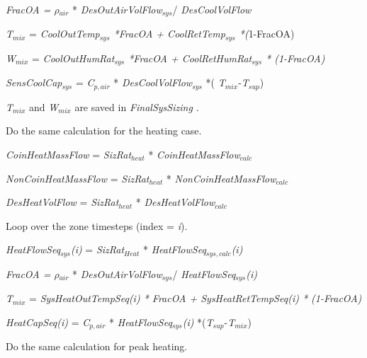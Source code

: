 \emph{FracOA = $\rho$\(_{air}\)} * \emph{DesOutAirVolFlow\(_{sys}\)}/ \emph{DesCoolVolFlow}

\emph{T\(_{mix}\)} = \emph{CoolOutTemp\(_{sys}\) *FracOA + CoolRetTemp\(_{sys}\) *(}1-FracOA)

\emph{W\(_{mix}\)} = \emph{CoolOutHumRat\(_{sys}\) *FracOA + CoolRetHumRat\(_{sys}\) * (1-FracOA)}

\emph{SensCoolCap\(_{sys}\)} = \emph{C\(_{p,air}\)} * \emph{DesCoolVolFlow\(_{sys}\)} *( \emph{T\(_{mix}\)}-\emph{T\(_{sup}\)})

\emph{T\(_{mix}\)} and \emph{W\(_{mix}\)} are saved in \emph{FinalSysSizing} \emph{.}

\begin{enumerate}
\def\labelenumi{(\roman{enumi})}
\setcounter{enumi}{3}
\tightlist
{\setlength\itemindent{25pt} \item Do the same calculation for the heating case.}
\end{enumerate}

\emph{CoinHeatMassFlow} = \emph{SizRat\(_{heat}\)} * \emph{CoinHeatMassFlow\(_{calc}\)}

\emph{NonCoinHeatMassFlow} = \emph{SizRat\(_{heat}\)} * \emph{NonCoinHeatMassFlow\(_{calc}\)}

\emph{DesHeatVolFlow} = \emph{SizRat\(_{heat}\)} * \emph{DesHeatVolFlow\(_{calc}\)}

\begin{enumerate}
\def\labelenumi{(\roman{enumi})}
\setcounter{enumi}{4}
\tightlist
{\setlength\itemindent{25pt} \item Loop over the zone timesteps (index = \emph{i}).}
\end{enumerate}

\emph{HeatFlowSeq\(_{sys}\)(i)} = \emph{SizRat\(_{Heat}\)} * \emph{HeatFlowSeq\(_{sys,calc}\)(i)}

\emph{FracOA = $\rho$\(_{air}\)} * \emph{DesOutAirVolFlow\(_{sys}\)}/ \emph{HeatFlowSeq\(_{sys}\)(i)}

\emph{T\(_{mix}\)} = \emph{SysHeatOutTempSeq(i) * FracOA + SysHeatRetTempSeq(i) * (1-FracOA)}

\emph{HeatCapSeq(i)} = \emph{C\(_{p,air}\)} * \emph{HeatFlowSeq\(_{sys}\)(i)} *(\emph{T\(_{sup}\)}-\emph{T\(_{mix}\)})

\begin{enumerate}
\def\labelenumi{(\roman{enumi})}
\setcounter{enumi}{5}
\tightlist
{\setlength\itemindent{25pt} \item Do the same calculation for peak heating.}
\end{enumerate}


